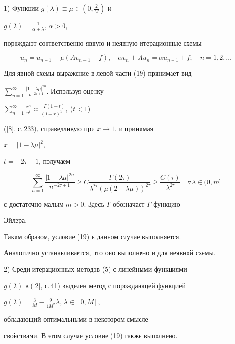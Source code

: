\begin{exam} 


1) Функции $g(\lambda)\equiv\mu\in(0,\frac{2}{M})$ и 


$g(\lambda)=\frac{1}{\alpha+\lambda}$, $\alpha>0$, 


порождают соответственно явную и неявную итерационные схемы 


$$ 


u_n=u_{n-1}-\mu(Au_{n-1}-f),\quad 


\alpha u_n+Au_n=\alpha u_{n-1}+f;\quad 


n=1,2,\dotsc 


$$ 


Для явной схемы выражение в левой части (19) принимает вид 


$\sum\limits^\infty_{n=1}\frac{|1-\lambda\mu|^{2n}} 


{n^{-2\tau+1}}$. Используя оценку 


$\sum\limits^\infty_{n=1}\frac{x^n}{n^t}\asymp 


\frac{\Gamma(1-t)}{(1-x)^{1-t}}$ ($t<1$) 


([8], с.\,233), справедливую при $x\to1$, и принимая 


$x=|1-\lambda\mu|^2$, 


$t=-2\tau+1$, получаем 


$$ 


\sum^\infty_{n=1}\frac{|1-\lambda\mu|^{2n}}{n^{-2\tau+1}} 


\ge C\frac{\Gamma(2\tau)}{\lambda^{2\tau}(\mu(2-\lambda\mu))^{2\tau}} 


\ge\frac{C(\tau)}{\lambda^{2\tau}}\quad 


\forall\lambda\in(0,m] 


$$ 


с достаточно малым $m>0$. Здесь $\Gamma$ обозначает $\Gamma$-функцию 


Эйлера. 


Таким образом, условие (19) в данном случае выполняется. 


Аналогично устанавливается, что оно выполнено и для неявной схемы. 


 


2) Среди итерационных методов (5) с линейными функциями 


$g(\lambda)$ в ([2], с.\,41) выделен метод с порождающей функцией 


$g(\lambda)=\frac{3}{M}-\frac{9}{4M^2}\lambda$, $\lambda\in[0,M]$, 


обладающий оптимальными в некотором смысле 


свойствами. В этом случае условие (19) также выполнено. 


\end{exam} 


